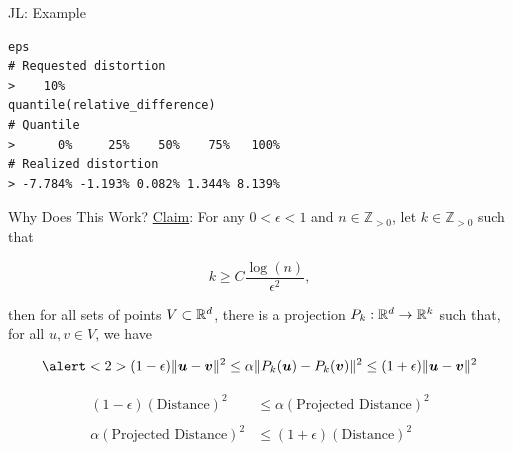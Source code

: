 \documentclass[14pt]{beamer}
\begin{document}
\begin{frame}[fragile]{JL: Example}
  \begin{lstlisting}
eps
# Requested distortion
>    10%
quantile(relative_difference)
# Quantile
>      0%     25%    50%    75%   100%
# Realized distortion
> -7.784% -1.193% 0.082% 1.344% 8.139%
  \end{lstlisting}
\end{frame}

\begin{frame}{Why Does This Work?}
  \underline{Claim}: For any $0<\epsilon<1$ and $n\in\mathbb{Z}_{>0}$, let
  $k\in\mathbb{Z}_{>0}$ such that

  \begin{equation*}
    k \geq C \frac{\log(n)}{\epsilon^2},
  \end{equation*}

  \noindent then for all sets of points $V\subset\mathbb{R}^{d}$, there is a projection
  $P_k:\mathbb{R}^{d}\to\mathbb{R}^{k}$ such that, for all $u,v\in V$, we have

    \begin{equation*}
      \alert<2>{(1 - \epsilon)\|\vu - \vv\|^2 \leq \alpha\|P_k(\vu) - P_k(\vv)\|^2 \leq %
      (1 + \epsilon)\|\vu - \vv\|^2
}    \end{equation*}
\end{frame}

\begin{frame}{}
    \begin{equation*} \begin{aligned}
        (1 - \epsilon)(\text{Distance})^2 &\leq %
          \alpha(\text{Projected Distance})^2 \\
        &\, \\
        \alpha(\text{Projected Distance})^2 &\leq %
          (1 + \epsilon)(\text{Distance})^2\\
    \end{aligned} \end{equation*}
\end{frame}
\end{document}

